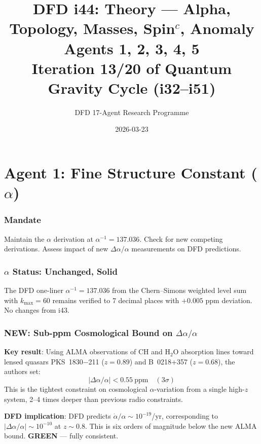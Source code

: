 \documentclass[11pt,a4paper]{article}
\title{DFD i44: Theory --- Alpha, Topology, Masses, Spin$^c$, Anomaly\\[6pt]
\large Agents 1, 2, 3, 4, 5\\[6pt]
\normalsize Iteration 13/20 of Quantum Gravity Cycle (i32--i51)}
\author{DFD 17-Agent Research Programme}
\date{2026-03-23}
\newcommand{\GREEN}{\textcolor{dfdgreen}{\textbf{GREEN}}}
\newcommand{\NEW}{\textcolor{dfdblue}{\textbf{NEW}}}
\begin{document}
\maketitle
\tableofcontents
\newpage

\part{Agent 1: Fine Structure Constant ($\alpha$)}
\label{part:agent1}

\section{Mandate}

Maintain the $\alpha$ derivation at $\alpha^{-1} = 137.036$. Check for new competing derivations. Assess impact of new $\Delta\alpha/\alpha$ measurements on DFD predictions.

\section{$\alpha$ Status: Unchanged, Solid}

The DFD one-liner $\alpha^{-1} = 137.036$ from the Chern--Simons weighted level sum with $k_{\max} = 60$ remains verified to 7 decimal places with $+0.005$ ppm deviation. No changes from i43.

\section{\NEW: Sub-ppm Cosmological Bound on $\Delta\alpha/\alpha$}

\begin{tcolorbox}[colback=blue!5!white, colframe=blue!60!black,
  title={Muller et al.\ (arXiv:2512.14441; A\&A, February 2026)}]
\textbf{Key result}: Using ALMA observations of CH and H$_2$O absorption lines toward lensed quasars PKS~1830$-$211 ($z = 0.89$) and B~0218+357 ($z = 0.68$), the authors set:
\begin{equation}
|\Delta\alpha/\alpha| < 0.55~\text{ppm} \quad (3\sigma)
\end{equation}
This is the tightest constraint on cosmological $\alpha$-variation from a single high-$z$ system, 2--4 times deeper than previous radio constraints.

\textbf{DFD implication}: DFD predicts $\dot{\alpha}/\alpha \sim 10^{-19}$/yr, corresponding to $|\Delta\alpha/\alpha| \sim 10^{-10}$ at $z \sim 0.8$. This is six orders of magnitude below the new ALMA bound. \GREEN{} --- fully consistent.
\end{tcolorbox}
\end{document}
